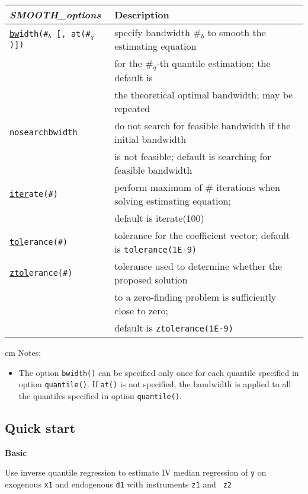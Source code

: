 \begin{tabular}{ll}
\hline
{\it SMOOTH\_options} & Description\\
\hline
{\tt \underline{bw}idth(\#$_b$ [, at(\#$_{q}$)])} &
specify bandwidth \#$_b$ to smooth the estimating equation \\
& for the \#$_q$-th quantile estimation; the default is \\
&the theoretical optimal bandwidth; may be repeated
\\
{\tt nosearchbwidth}&	
do not search for feasible bandwidth if the initial bandwidth \\
& is not feasible; default is searching for feasible bandwidth \\
{\tt \underline{iter}ate(\#)} & perform maximum of \# iterations when solving
estimating equation; \\ &default is iterate(100)\\
{\tt \underline{tol}erance(\#)} & 
tolerance for the coefficient vector; default is {\tt tolerance(1E-9)} \\
{\tt \underline{ztol}erance(\#)} & tolerance used to determine 
whether the proposed solution \\ 
& to a zero-finding problem is sufficiently close to zero; \\
& default is {\tt ztolerance(1E-9)} \\
\hline
\end{tabular}

 cm
Notes:
\begin{itemize}
 
  \item The option {\tt bwidth()} can be specified only once for each
    quantile specified in option {\tt quantile()}.  If {\tt at()} is not
    specified, the bandwidth is applied to all the quantiles specified in option
    {\tt quantile()}.

\end{itemize}

\subsection{Quick start}

\noindent
{\bf Basic}
\vskip 0.4cm

\noindent
Use  inverse quantile regression to estimate IV median regression of {\tt y} on
exogenous {\tt x1} and endogenous {\tt d1} with instruments {\tt z1} and {\tt
z2}


